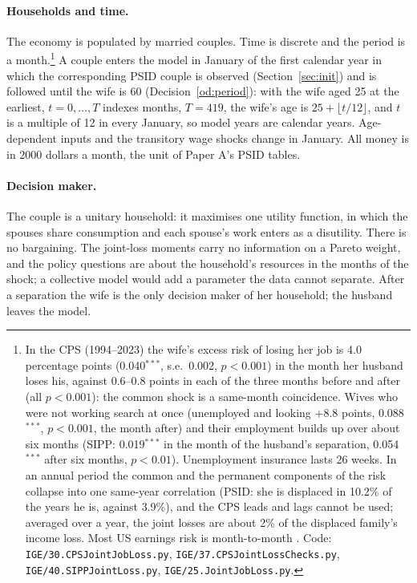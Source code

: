 \documentclass[11pt]{article}
\newcommand{\code}[1]{\texttt{#1}}
\newcommand{\1}{\mathbf{1}}
\begin{document}
\paragraph{Households and time.} The economy is populated by married couples. Time is discrete and the period is a
month.\footnote{In the CPS (1994--2023) the wife's excess risk of losing her job is 4.0 percentage points
(0.040$^{***}$, s.e.\ 0.002, $p<0.001$) in the month her husband loses his, against 0.6--0.8 points in each of the
three months before and after (all $p<0.001$): the common shock is a same-month coincidence. Wives who were not working
search at once (unemployed and looking $+8.8$ points, 0.088$^{***}$, $p<0.001$, the month after) and their employment
builds up over about six months (SIPP: 0.019$^{***}$ in the month of the husband's separation, 0.054$^{***}$ after six
months, $p<0.01$). Unemployment insurance lasts 26 weeks. In an annual period the common and the permanent components
of the risk collapse into one same-year correlation (PSID: she is displaced in 10.2\% of the years he is, against 3.9\%),
and the CPS leads and lags cannot be used; averaged over a year, the joint losses are about 2\% of the displaced family's
income loss. Most US earnings risk is month-to-month \citep{ganong2026earnings}. Code: \code{IGE/30.CPSJointJobLoss.py},
\code{IGE/37.CPSJointLossChecks.py}, \code{IGE/40.SIPPJointLoss.py}, \code{IGE/25.JointJobLoss.py}.}
A couple enters the model in January of the first calendar year in which the corresponding PSID couple is observed
(Section~\ref{sec:init}) and is followed until the wife is 60 (Decision~\ref{od:period}): with the wife aged 25 at the
earliest, $t = 0, \dots, T$ indexes months, $T = 419$, the wife's age is $25 + \lfloor t/12 \rfloor$, and $t$ is a
multiple of 12 in every January, so model years are calendar years. Age-dependent inputs and the transitory wage shocks
change in January. All money is in 2000 dollars a month, the unit of Paper A's PSID tables.

\paragraph{Decision maker.} The couple is a unitary household: it maximises one utility function, in which the spouses
share consumption and each spouse's work enters as a disutility. There is no bargaining. The joint-loss moments carry no
information on a Pareto weight, and the policy questions are about the household's resources in the months of the
shock; a collective model would add a parameter the data cannot separate. After a separation the wife is the only
decision maker of her household; the husband leaves the model.
\end{document}
